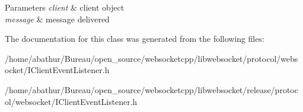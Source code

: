 \begin{DoxyParams}{Parameters}
{\em client} & client object \\
\hline
{\em message} & message delivered \\
\hline
\end{DoxyParams}


The documentation for this class was generated from the following files\-:\begin{DoxyCompactItemize}
\item 
/home/abathur/\-Bureau/open\-\_\-source/websocketcpp/libwebsocket/protocol/websocket/I\-Client\-Event\-Listener.\-h\item 
/home/abathur/\-Bureau/open\-\_\-source/websocketcpp/libwebsocket/release/protocol/websocket/I\-Client\-Event\-Listener.\-h\end{DoxyCompactItemize}
